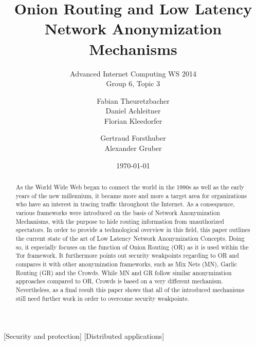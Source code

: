 \documentclass{sig-alternate}
\begin{document}
\title{Onion Routing and Low Latency Network Anonymization Mechanisms}
\subtitle{Advanced Internet Computing WS 2014 \\ Group 6, Topic 3}


\author{
\alignauthor
Fabian Theuretzbacher\\
\alignauthor
Daniel Achleitner\\
\alignauthor Florian Kleedorfer\\
\and  %
\alignauthor Gertraud Forsthuber\\
\alignauthor Alexander Gruber\\
\and
\and
{}
}

\date{\today}
\maketitle

\begin{abstract}

As the World Wide Web began to connect the world in the 1990s as well as the early years of the new millennium, it became more and more a target area for organizations who have an interest in tracing traffic throughout the Internet. As a consequence, various frameworks were introduced on the basis of Network Anonymization Mechanisms, with the purpose to hide routing information from unauthorized spectators. In order to provide a technological overview in this field, this paper outlines the current state of the art of Low Latency Network Anonymization Concepts. Doing so, it especially focuses on the function of Onion Routing (OR) as it is used within the Tor framework. It furthermore points out security weakpoints regarding to OR and compares it with other anonymization frameworks, such as Mix Nets (MN), Garlic Routing (GR) and the Crowds. While MN and GR follow similar anonymization approaches compared to OR, Crowds is based on a very different mechanism. Nevertheless, as a final result this paper shows that all of the introduced mechanisms still need further work in order to overcome security weakpoints.

\end{abstract}

[Security and protection]
[Distributed applications]
\end{document}
